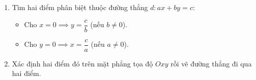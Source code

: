 \begin{enumerate}
\item Tìm hai điểm phân biệt thuộc đường thẳng $d\colon ax + by = c$:
\begin{itemize}
\item Cho $x = 0 \implies y = \dfrac{c}{b}$ (nếu $b \ne 0$).
\item Cho $y = 0 \implies x = \dfrac{c}{a}$ (nếu $a \ne 0$).
\end{itemize}
\item Xác định hai điểm đó trên mặt phẳng tọa độ $Oxy$ rồi vẽ đường thẳng đi qua hai điểm.
\end{enumerate}
